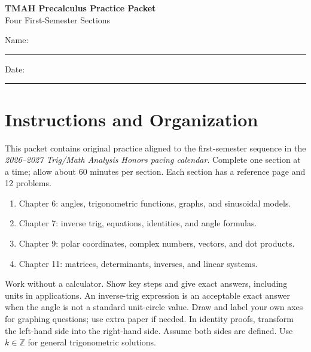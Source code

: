 \documentclass[11pt]{article}
\begin{document}
\begin{center}
  {\Large\textbf{TMAH Precalculus Practice Packet}}\\[3pt]
  {\large Four First-Semester Sections}
\end{center}

Name: \rule{2.7in}{0.4pt}\hfill Date: \rule{1.5in}{0.4pt}

\section*{Instructions and Organization}
This packet contains original practice aligned to the first-semester sequence
in the \textit{2026--2027 Trig/Math Analysis Honors pacing calendar}.
Complete one section at a time; allow about 60 minutes per section.
Each section has a reference page and 12 problems.
\begin{enumerate}[leftmargin=*,itemsep=0.15em]
  \item Chapter 6: angles, trigonometric functions, graphs, and sinusoidal models.
  \item Chapter 7: inverse trig, equations, identities, and angle formulas.
  \item Chapter 9: polar coordinates, complex numbers, vectors, and dot products.
  \item Chapter 11: matrices, determinants, inverses, and linear systems.
\end{enumerate}
Work without a calculator. Show key steps and give exact answers, including
units in applications. An inverse-trig expression is an acceptable exact answer
when the angle is not a standard unit-circle value. Draw and label your own
axes for graphing questions; use extra paper if needed. In identity proofs,
transform the left-hand side into the right-hand side. Assume both sides are
defined. Use $k\in\mathbb Z$ for general trigonometric solutions.
\end{document}
